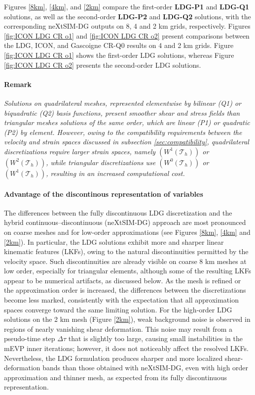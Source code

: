 \documentclass[11pt]{article}
\begin{document}
Figures \ref{8km}, \ref{4km}, and \ref{2km} compare the first-order \textbf{LDG-P1} and \textbf{LDG-Q1} solutions, as well as the second-order \textbf{LDG-P2} and \textbf{LDG-Q2} solutions, with the corresponding neXtSIM-DG outputs on 8, 4 and 2 km grids, respectively. Figures \ref{fig:ICON LDG CR o1} and \ref{fig:ICON LDG CR o2} present comparisons between the LDG, ICON, and Gascoigne CR-Q0 results on 4 and 2 km grids. Figure \ref{fig:ICON LDG CR o1} shows the first-order LDG solutions, whereas Figure \ref{fig:ICON LDG CR o2} presents the second-order LDG solutions.

\paragraph{Remark} \textit{Solutions on quadrilateral meshes, represented elementwise by bilinear (Q1) or biquadratic (Q2) basis functions, present smoother shear and stress fields than triangular meshes solutions of the same order, which are linear (P1) or quadratic (P2) by element. 
However, owing to the compatibility requirements between the velocity and strain spaces discussed in subsection \ref{sec:compatibility}, quadrilateral discretizations require larger strain spaces, namely $(W^1(\mathcal{T}_h))$ or $(W^2(\mathcal{T}_h))$, while triangular discretizations use $(W^0(\mathcal{T}_h))$ or $(W^1(\mathcal{T}_h))$, resulting in an increased computational cost. }



\paragraph{Advantage of the discontinous representation of variables} 
The differences between the fully discontinuous LDG discretization and the hybrid continuous–discontinuous (neXtSIM-DG) approach are most pronounced on coarse meshes and for low-order approximations (see Figures \ref{8km}, \ref{4km} and \ref{2km}). In particular, the LDG solutions exhibit more and sharper linear kinematic features (LKFs), owing to the natural discontinuities permitted by the velocity space. Such discontinuities are already visible on coarse 8 km meshes at low order, especially for triangular elements, although some of the resulting LKFs appear to be numerical artifacts, as discussed below. As the mesh is refined or the approximation order is increased, the differences between the discretizations become less marked, consistently with the expectation that all approximation spaces converge toward the same limiting solution. For the high-order LDG solutions on the 2 km mesh (Figure \ref{2km}), weak background noise is observed in regions of nearly vanishing shear deformation. This noise may result from a pseudo-time step $\Delta\tau$ that is slightly too large, causing small instabilities in the mEVP inner iterations; however, it does not noticeably affect the resolved LKFs. Nevertheless, the LDG formulation produces sharper and more localized shear-deformation bands than those obtained with neXtSIM-DG, even with high order approximation and thinner mesh, as expected from its fully discontinuous representation.
\end{document}
